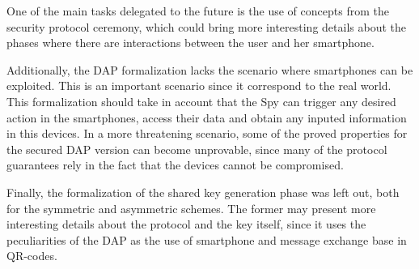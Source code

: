 One of the main tasks delegated to the future is the use of concepts from the security protocol ceremony, which could bring more interesting details about the phases where there are interactions between the user and her smartphone.

Additionally, the DAP formalization lacks the scenario where smartphones can be exploited. This is an important scenario since it correspond to the real world. This formalization should take in account that the Spy can trigger any desired action in the smartphones, access their data and obtain any inputed information in this devices. In a more threatening scenario, some of the proved properties for the secured DAP version can become unprovable, since many of the protocol guarantees rely in the fact that the devices cannot be compromised.

Finally, the formalization of the shared key generation phase was left out, both for the symmetric and asymmetric schemes. The former may present more interesting details about the protocol and the key itself, since it uses the peculiarities of the DAP as the use of smartphone and message exchange base in QR-codes.

